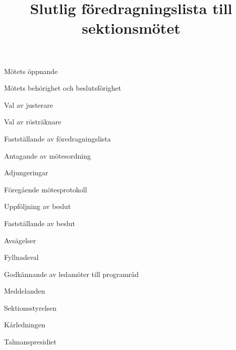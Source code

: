 \documentclass{../sektionsmote} %
\title{Slutlig föredragningslista till sektionsmötet}
\begin{document}
\maketitle

\begin{ootd}

\item{Mötets öppnande}

\item{Mötets behörighet och beslutsförighet}

\item{Val av justerare}

\item{Val av rösträknare}

\item{Fastställande av föredragningslista}

\item{Antagande av mötesordning}

\item{Adjungeringar}

\item{Föregående mötesprotokoll}

\item{Uppföljning av beslut}

\item{Fastställande av beslut}
\begin{ootd}
    \item Avsägelser
    \item Fyllnadsval
    \item Godkännande av ledamöter till programråd
\end{ootd}

\item{Meddelanden}
\begin{ootd}
    \item Sektionsstyrelsen
    \item Kårledningen
    \item Talmanspresidiet
\end{ootd}


\end{ootd}
\end{document}
